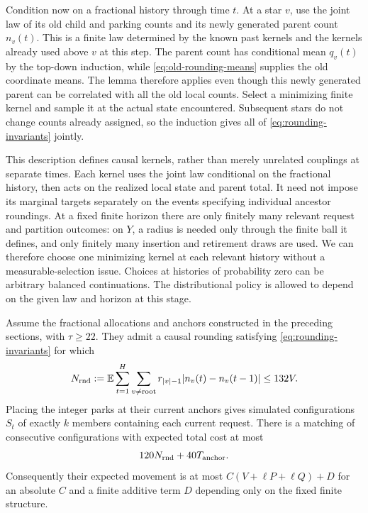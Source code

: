 Condition now on a fractional history through time $t$.  At a star $v$, use
the joint law of its old child and parking counts and its newly generated
parent count $n_v(t)$.  This is a finite law determined by the known past
kernels and the kernels already used above $v$ at this step.  The parent
count has conditional mean $q_v(t)$ by the top-down induction, while
\eqref{eq:old-rounding-means} supplies the old coordinate means.  The lemma
therefore applies even though this newly generated parent can be correlated
with all the old local counts.  Select a minimizing finite kernel and sample
it at the actual state encountered.  Subsequent stars do not change counts
already assigned, so the induction gives all of
\eqref{eq:rounding-invariants} jointly.

This description defines causal kernels, rather than merely unrelated
couplings at separate times.  Each kernel uses the joint law conditional on
the fractional history, then acts on the realized local state and parent
total.  It need not impose its marginal targets separately on the events
specifying individual ancestor roundings.  At a fixed finite horizon there
are only finitely many relevant request and partition outcomes: on $Y$, a
radius is needed only through the finite ball it defines, and only finitely
many insertion and retirement draws are used.  We can therefore choose one
minimizing kernel at each relevant history without a measurable-selection
issue.  Choices at histories of probability zero can be arbitrary balanced
continuations.  The distributional policy is allowed to depend on the given
law and horizon at this stage.

\begin{proposition}\label{prop:rounding}
Assume the fractional allocations and anchors constructed in the preceding
sections, with $\tau\ge22$.  They admit a causal rounding satisfying
\eqref{eq:rounding-invariants} for which
\begin{equation}\label{eq:rounding-global}
 N_{\rm rnd}:=\mathbb E\sum_{t=1}^H\sum_{v\ne{\rm root}}
                 r_{|v|-1}|n_v(t)-n_v(t-1)|\le132V.
\end{equation}
Placing the integer parks at their current anchors gives simulated
configurations $S_t$ of exactly $k$ members containing each current request.
There is a matching of consecutive configurations with expected total cost
at most
\begin{equation}\label{eq:rounding-realization}
                         120N_{\rm rnd}+40T_{\rm anchor}.
\end{equation}
Consequently their expected movement is at most
$C(V+\ell P+\ell Q)+D$ for an absolute $C$ and a finite additive term $D$
depending only on the fixed finite structure.
\end{proposition}

